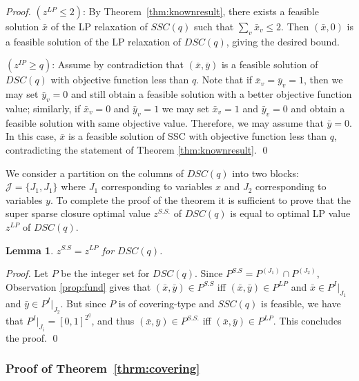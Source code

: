 \documentclass[smallextended]{svjour3}
\newtheorem{lemma}[proposition]{Lemma}
\begin{document}
\begin{proof}
	$(z^{LP} \le 2)$: By Theorem~\ref{thm:knownresult}, there exists a feasible solution $\bar{x}$ of the LP relaxation of $SSC(q)$ such that $\sum_v \bar{x}_v \leq 2$. Then $(\bar{x}, 0)$ is a feasible solution of the LP relaxation of $DSC(q)$, giving the desired bound.
	
	\smallskip \noindent $(z^{IP} \ge q)$: Assume by contradiction that $(\bar{x}, \bar{y})$ is a feasible solution of $DSC(q)$ with objective function less than $q$. Note that if $\bar{x}_v = \bar{y}_v = 1$, then we may set $\bar{y}_v = 0$ and still obtain a feasible solution with a better objective function value; similarly, if $\bar{x}_v = 0$ and $\bar{y}_v = 1$ we may set $\bar{x}_v = 1$ and $\bar{y}_v = 0$ and obtain a feasible solution with same objective value. Therefore, we may assume that $\bar{y} = 0$. In this case, $\bar{x}$ is a feasible solution of SSC with objective function less than $q$, contradicting the statement of Theorem \ref{thm:knownresult}.{
\ifmp
	\hfill \qed
\fi
}
\end{proof}

We consider a partition on the columns of $DSC(q)$ into two blocks: $\mathcal{J} = \{J_1, J_1\}$ where $J_1$ corresponding to variables $x$ and $J_2$ corresponding to variables $y$. To complete the proof of the theorem it is sufficient to prove that the super sparse closure optimal value $z^{S.S.}$ of $DSC(q)$ is equal to optimal LP value $z^{LP}$ of $DSC(q)$. 

\begin{lemma}
	$z^{S.S} = z^{LP}$ for $DSC(q)$.
\end{lemma}

\begin{proof}
	Let $P$ be the integer set for $DSC(q)$. 
	Since $P^{S.S} = P^{(J_1)} \cap P^{(J_2)}$, Observation \ref{prop:fund} gives that $(\bar{x}, \bar{y}) \in P^{S.S}$ iff $(\bar{x}, \bar{y}) \in P^{LP}$ and $\bar{x} \in P^I|_{J_1}$ and $\bar{y}  \in P^I|_{J_2}$. But since $P$ is of covering-type and $SSC(q)$ is feasible, we have that $P^I|_{J_i} = [0,1]^{2^q}$, and thus $(\bar{x}, \bar{y}) \in P^{S.S.}$ iff $(\bar{x}, \bar{y}) \in P^{LP}$. This concludes the proof.{
\ifmp
	\hfill \qed
\fi
}
\end{proof}

\subsubsection{Proof of Theorem~\ref{thrm:covering}}
\end{document}
